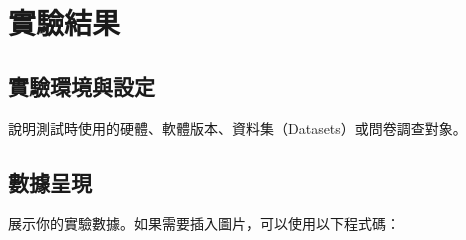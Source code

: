 \chapter{實驗結果}
\label{cha:CH4-Result} 

\section{實驗環境與設定}
說明測試時使用的硬體、軟體版本、資料集（Datasets）或問卷調查對象。

\section{數據呈現}
展示你的實驗數據。如果需要插入圖片，可以使用以下程式碼：
